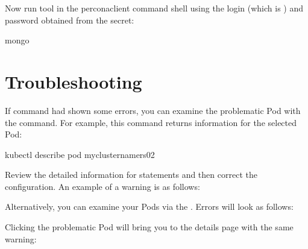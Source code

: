 \documentclass[letterpaper,10pt,english]{sphinxmanual}
\begin{document}
Now run  tool in the percona\sphinxhyphen{}client command shell using the login
(which is ) and password obtained from the secret:

\begin{sphinxVerbatim}[commandchars=\\\{\}]
mongo 
\end{sphinxVerbatim}


\section{Troubleshooting}
\label{\detokenize{gke:troubleshooting}}
If  command had shown some errors, you can examine the problematic Pod with the  command.  For example, this command returns information for the selected Pod:

\begin{sphinxVerbatim}[commandchars=\\\{\}]
kubectl describe pod my\PYGZhy{}cluster\PYGZhy{}name\PYGZhy{}rs0\PYGZhy{}2
\end{sphinxVerbatim}

Review the detailed information for  statements and then correct the configuration. An example of a warning is as follows:
\begin{quote}

\end{quote}

Alternatively, you can examine your Pods via the . Errors will look as follows:


Clicking the problematic Pod will bring you to the details page with the same warning:
\end{document}

